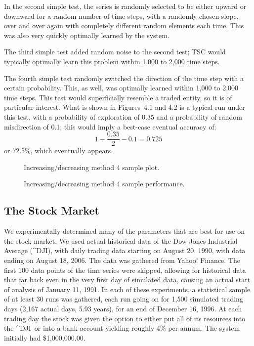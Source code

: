 \enlargethispage{2\baselineskip}
In the second simple test, the series is randomly selected to be either upward or downward for a random number of time steps, with a randomly chosen slope, over and over again with completely different random elements each time.
This was also very quickly optimally learned by the system.

The third simple test added random noise to the second test;
TSC would typically optimally learn this problem within 1,000 to 2,000 time steps.

The fourth simple test randomly switched the direction of the time step with a certain probability.
This, as well, was optimally learned within 1,000 to 2,000 time steps.
This test would superficially resemble a traded entity, so it is of particular interest.
What is shown in Figures~4.1 and 4.2 is a typical run under this test, with a probability of exploration of 0.35 and a probability of random misdirection of 0.1;
this would imply a best-case eventual accuracy of:
\[1 - \frac{0.35}{2} -0.1 = 0.725\]
or 72.5\%, which eventually appears.

\begin{figure}

\label{fig:inde4plot}
\caption{Increasing/decreasing method 4 sample plot.}
\end{figure}

\begin{figure}

\label{fig:inde4perf}
\caption{Increasing/decreasing method 4 sample performance.}
\end{figure}

\subsection{The Stock Market}
\newcommand{\DJI}{\textasciicircum DJI}
We experimentally determined many of the parameters that are best for use on the stock market.
We used actual historical data of the Dow Jones Industrial Average (\DJI), with daily trading data starting on August 20, 1990, with data ending on August 18, 2006.
The data was gathered from Yahoo! Finance.
The first 100 data points of the time series were skipped, allowing for historical data that far back even in the very first day of simulated data, causing an actual start of analysis of January 11, 1991.
In each of these experiments, a statistical sample of at least 30 runs was gathered, each run going on for 1,500 simulated trading days (2,167 actual days, 5.93 years), for an end of December 16, 1996.
At each trading day the stock was given the option to either put all of its resources into the \DJI\ or into a bank account yielding roughly 4\% per annum.
The system initially had \$1,000,000.00.

